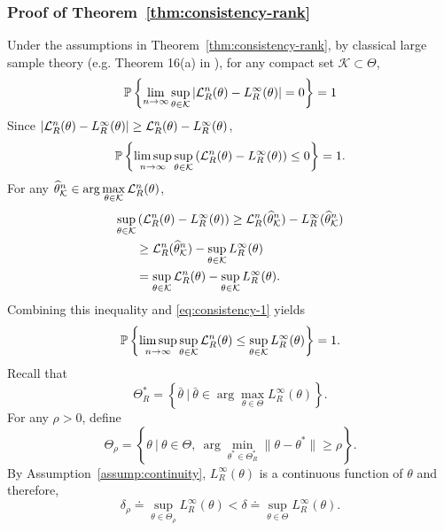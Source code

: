 \documentclass[11pt,a4paper]{article}
\newcommand{\wh}[1]{\widehat{#1}}
\newcommand{\objr}{{\cal L}_R^n}
\begin{document}
\subsubsection{Proof of Theorem~\ref{thm:consistency-rank}}
\label{sec:pf-consis-ranking}
Under the assumptions in Theorem~\ref{thm:consistency-rank}, by classical large sample theory (e.g. Theorem 16(a) in \cite{ferguson1996course}), for any compact set $\mathcal{K}\subset \Theta$,
\begin{equation}
  \mathbb{P} \left\{\lim\limits_{n\rightarrow\infty}\sup\limits_{\theta\in\mathcal{K}} |\objr(\theta) - L_R^\infty(\theta)| = 0 \right\} = 1
  \label{eq:uniform-convergence}
\end{equation}
Since $|\objr(\theta) - L_R^\infty(\theta)|\geq \objr(\theta) - L_R^\infty(\theta)$, 
\begin{equation}
    \mathbb{P} \left\{\limsup\limits_{n\rightarrow\infty}\sup\limits_{\theta\in\mathcal{K}} \left(\objr(\theta) - L_R^\infty(\theta)\right) \leq 0 \right\} = 1. 
    \label{eq:consistency-1}
\end{equation}
For any $\wh{\theta}_{\mathcal{K}}^n \in \arg\max\limits_{\theta\in\mathcal{K}}\objr(\theta)$, 
\begin{align*}
\sup\limits_{\theta\in\mathcal{K}} & \left(\objr(\theta) - L_R^\infty(\theta)\right) \geq \objr(\wh{\theta}_{\mathcal{K}}^n) - L_R^\infty(\wh{\theta}_{\mathcal{K}}^n) \\
& \geq \objr(\wh{\theta}_{\mathcal{K}}^n) - \sup\limits_{\theta\in\mathcal{K}} L_R^\infty(\theta) \\
& = \sup\limits_{\theta\in\mathcal{K}} \objr(\theta) - \sup\limits_{\theta\in\mathcal{K}} L_R^\infty(\theta).
\end{align*}
Combining this inequality and \eqref{eq:consistency-1} yields
\begin{equation}
    \mathbb{P} \left\{\limsup\limits_{n\rightarrow\infty}\sup\limits_{\theta\in\mathcal{K}} \objr(\theta) \leq \sup\limits_{\theta\in\mathcal{K}}L_R^\infty(\theta)  \right\} = 1.
    \label{eq:strong1}
\end{equation}
Recall that 
\[
\Theta^*_R = \left\{\bar{\theta}~|~\bar{\theta} \in\arg\max_{\theta\in\Theta} L_R^\infty(\theta)\right\}.
\]
For any $\rho > 0$, define 
\[
\Theta_{\rho} = \left\{\theta~|~\theta\in\Theta, ~\arg\min_{\theta^*\in\Theta^*_R} \|\theta - \theta^*\| \geq \rho\right\}.
\]
By Assumption~\ref{assump:continuity}, $L_R^\infty(\theta)$ is a continuous function of $\theta$ and therefore, 
\[
\delta_{\rho} \doteq \sup_{\theta\in\Theta_{\rho}}L_R^\infty(\theta)<\delta\doteq \sup_{\theta\in\Theta}L_R^\infty(\theta). 
\]
\end{document}
